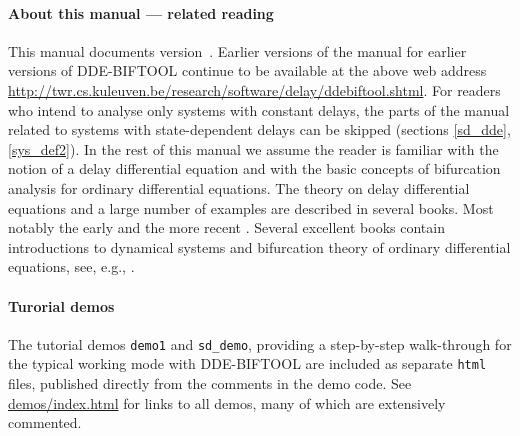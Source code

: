 \documentclass[10pt]{scrartcl}
\newcommand{\DDEBIFCODE}{\textsc{DDE-BIFTOOL}}
\newcommand{\ddebifweb}{\url{http://twr.cs.kuleuven.be/research/software/delay/ddebiftool.shtml}}
\newcommand{\demobase}{\url{demos/index.html}}
\begin{document}

\paragraph{About this manual --- related reading}
This manual documents version~\version. Earlier versions of the manual
for earlier versions of \DDEBIFCODE{} continue to be available at the
above web address \ddebifweb{}.  For readers who intend to analyse
only systems with constant delays, the parts of the manual related to
systems with state-dependent delays can be skipped (sections
\ref{sd_dde}, \ref{sys_def2}).  In the rest of this manual we assume
the reader is familiar with the notion of a delay differential
equation and with the basic concepts of bifurcation analysis for
ordinary differential equations.  The theory on delay differential
equations and a large number of examples are described in several
books. Most notably the early
\cite{Bell63,Driv77,El's73,Hale77a,Kolm86} and the more recent
\cite{Azbe91,Kolm92,Hale93,Diek95,Kolm99}.  Several excellent books
contain introductions to dynamical systems and bifurcation theory of
ordinary differential equations, see, e.g.,
\cite{Argy94,Chow82,Guck83,Kuzn04,Seyd94}.

\paragraph{Turorial demos}
The tutorial demos \texttt{demo1} and
\texttt{sd\_demo}, providing a step-by-step walk-through for the
typical working mode with \DDEBIFCODE{} are included as separate
\texttt{html} files, published directly from the comments in the demo
code. See \demobase{} for links to all demos, many of which are
extensively commented.
\end{document}
